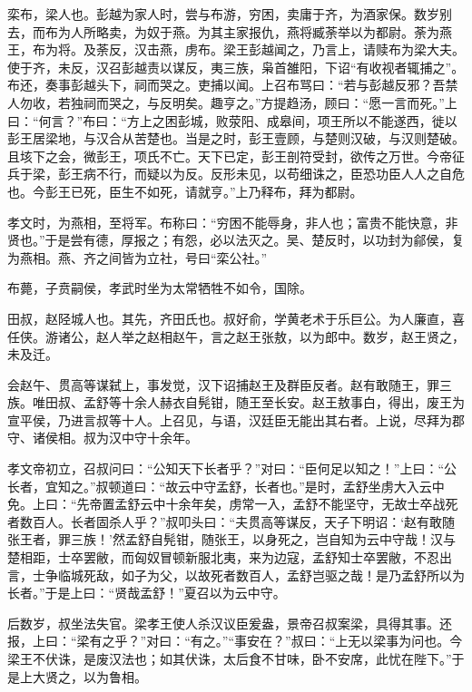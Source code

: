 \documentclass[12pt,UTF8]{ctexbook}
\begin{document}
栾布，梁人也。彭越为家人时，尝与布游，穷困，卖庸于齐，为酒家保。数岁别去，而布为人所略卖，为奴于燕。为其主家报仇，燕将臧荼举以为都尉。荼为燕王，布为将。及荼反，汉击燕，虏布。梁王彭越闻之，乃言上，请赎布为梁大夫。使于齐，未反，汉召彭越责以谋反，夷三族，枭首雒阳，下诏“有收视者辄捕之”。布还，奏事彭越头下，祠而哭之。吏捕以闻。上召布骂曰：“若与彭越反邪？吾禁人勿收，若独祠而哭之，与反明矣。趣亨之。”方提趋汤，顾曰：“愿一言而死。”上曰：“何言？”布曰：“方上之困彭城，败荥阳、成皋间，项王所以不能遂西，徙以彭王居梁地，与汉合从苦楚也。当是之时，彭王壹顾，与楚则汉破，与汉则楚破。且垓下之会，微彭王，项氏不亡。天下已定，彭王剖符受封，欲传之万世。今帝征兵于梁，彭王病不行，而疑以为反。反形未见，以苟细诛之，臣恐功臣人人之自危也。今彭王已死，臣生不如死，请就亨。”上乃释布，拜为都尉。



孝文时，为燕相，至将军。布称曰：“穷困不能辱身，非人也；富贵不能快意，非贤也。”于是尝有德，厚报之；有怨，必以法灭之。吴、楚反时，以功封为鄃侯，复为燕相。燕、齐之间皆为立社，号曰“栾公社。”



布薨，子贲嗣侯，孝武时坐为太常牺牲不如令，国除。



田叔，赵陉城人也。其先，齐田氏也。叔好俞，学黄老术于乐巨公。为人廉直，喜任侠。游诸公，赵人举之赵相赵午，言之赵王张敖，以为郎中。数岁，赵王贤之，未及迁。



会赵午、贯高等谋弑上，事发觉，汉下诏捕赵王及群臣反者。赵有敢随王，罪三族。唯田叔、孟舒等十余人赫衣自髡钳，随王至长安。赵王敖事白，得出，废王为宣平侯，乃进言叔等十人。上召见，与语，汉廷臣无能出其右者。上说，尽拜为郡守、诸侯相。叔为汉中守十余年。



孝文帝初立，召叔问曰：“公知天下长者乎？”对曰：“臣何足以知之！”上曰：“公长者，宜知之。”叔顿道曰：“故云中守孟舒，长者也。”是时，孟舒坐虏大入云中免。上曰：“先帝置孟舒云中十余年矣，虏常一入，孟舒不能坚守，无故士卒战死者数百人。长者固杀人乎？”叔叩头曰：“夫贯高等谋反，天子下明诏：‘赵有敢随张王者，罪三族！’然孟舒自髡钳，随张王，以身死之，岂自知为云中守哉！汉与楚相距，士卒罢敝，而匈奴冒顿新服北夷，来为边寇，孟舒知士卒罢敝，不忍出言，士争临城死敌，如子为父，以故死者数百人，孟舒岂驱之哉！是乃孟舒所以为长者。”于是上曰：“贤哉孟舒！”夏召以为云中守。



后数岁，叔坐法失官。梁孝王使人杀汉议臣爰盎，景帝召叔案梁，具得其事。还报，上曰：“梁有之乎？”对曰：“有之。”“事安在？”叔曰：“上无以梁事为问也。今梁王不伏诛，是废汉法也；如其伏诛，太后食不甘味，卧不安席，此忧在陛下。”于是上大贤之，以为鲁相。
\end{document}
